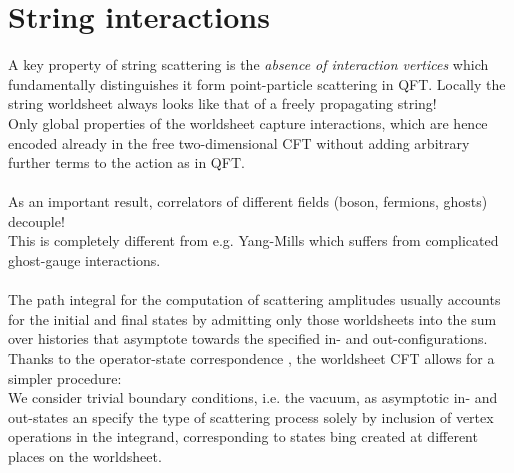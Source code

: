 \section{String interactions}
A key property of string scattering is the \emph{absence of interaction vertices} which fundamentally distinguishes it form point-particle scattering in QFT. Locally the string worldsheet always looks like that of a freely propagating string!\\
Only global properties of the worldsheet capture interactions, which are hence encoded already in the free two-dimensional CFT without adding arbitrary further terms to the action as in QFT.\\
\\
As an important result, correlators of different fields (boson, fermions, ghosts) decouple! \\
This is completely different from e.g. Yang-Mills which suffers from complicated ghost-gauge interactions.\\
\\
The path integral for the computation of scattering amplitudes usually accounts for the initial and final states by admitting only those worldsheets into the sum over histories that asymptote towards the specified in- and out-configurations. Thanks to the operator-state correspondence , the worldsheet CFT allows for a simpler procedure:\\
We consider trivial boundary conditions, i.e. the vacuum, as asymptotic in- and out-states an specify the type of scattering process solely by inclusion of vertex operations in the integrand, corresponding to states bing created at different places on the worldsheet.

